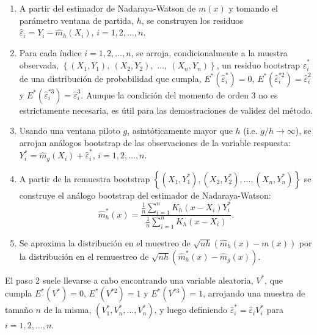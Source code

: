 \documentclass[]{book}
\theoremstyle{definition}
\theoremstyle{definition}
\theoremstyle{definition}
\theoremstyle{remark}
\begin{document}
\begin{enumerate}
\def\labelenumi{\arabic{enumi}.}
\item
  A partir del estimador de Nadaraya-Watson de \(m\left( x \right)\) y
  tomando el parámetro ventana de partida, \(h\), se construyen los
  residuos
  \(\hat{\varepsilon}_i = Y_i - \hat{m}_{h}\left( X_i \right)\),
  \(i=1, 2, \ldots, n\).
\item
  Para cada índice \(i=1,2,\ldots ,n\), se arroja, condicionalmente a la
  muestra observada,
  \(\left\{ \left( X_1,Y_1 \right), \ \left( X_2,Y_2 \right),\right.\)
  \(\left.\ldots ,\ \left( X_n,Y_n \right) \right\}\), un residuo
  bootstrap \(\hat{\varepsilon}_i^{\ast}\) de una distribución de
  probabilidad que cumpla,
  \(E^{\ast}\left( \hat{\varepsilon}_i^{\ast} \right) =0\),
  \(E^{\ast}\left( \hat{\varepsilon}_i^{\ast 2} \right) =\hat{ \varepsilon}_i^2\)
  y
  \(E^{\ast}\left( \hat{\varepsilon}_i^{\ast 3} \right) =\hat{\varepsilon}_i^{3}\).
  Aunque la condición del momento de orden 3 no es estrictamente
  necesaria, es útil para las demostraciones de validez del método.
\item
  Usando una ventana piloto \(g\), asintóticamente mayor que \(h\) (i.e.
  \(g/h\rightarrow \infty\)), se arrojan análogos bootstrap de las
  observaciones de la variable respuesta:
  \(Y_i^{\ast}=\hat{m}_{g}\left(X_i \right)  +\hat{\varepsilon}_i^{\ast}\),
  \(i=1,2,\ldots ,n\).
\item
  A partir de la remuestra bootstrap
  \(\left\{ \left( X_1,Y_1^{\ast } \right),\left( X_2,Y_2^{\ast} \right),\ldots ,\left( X_n,Y_n^{\ast} \right) \right\}\)
  se construye el análogo bootstrap del estimador de Nadaraya-Watson:
  \[\hat{m}_{h}^{\ast}\left( x \right) =\frac{\frac{1}{n}\sum_{i=1}^{n}K_{h}
  \left( x-X_i \right) Y_i^{\ast}}{\frac{1}{n}\sum_{i=1}^{n}K_{h}\left(
  x-X_i \right)}.\]
\item
  Se aproxima la distribución en el muestreo de
  \(\sqrt{nh}\left( \hat{m}_{h}\left( x \right) -m\left( x \right) \right)\)
  por la distribución en el remuestreo de
  \(\sqrt{nh}\left( \hat{m}_{h}^{\ast}\left( x \right) - \hat{m}_{g}\left( x \right) \right)\).
\end{enumerate}

El paso 2 suele llevarse a cabo encontrando una variable aleatoria,
\(V^{\ast}\), que cumpla \(E^{\ast}\left( V^{\ast} \right) =0\),
\(E^{\ast}\left( V^{\ast 2} \right) =1\) y
\(E^{\ast}\left( V^{\ast 3} \right) =1\), arrojando una muestra de
tamaño \(n\) de la misma,
\(\left( V_1^{\ast},V_n^{\ast},\ldots ,V_n^{\ast} \right)\), y luego
definiendo \(\hat{\varepsilon}_i^{\ast}=\hat{\varepsilon}_iV_i^{\ast}\)
para \(i=1, 2, \ldots, n\).
\end{document}
